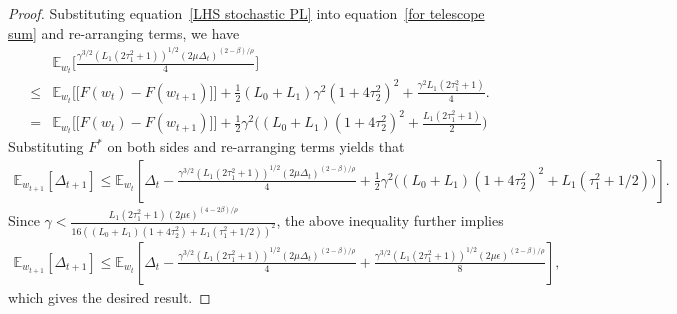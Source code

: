 \documentclass[10pt]{article} %
\def\eqref#1{equation~\ref{#1}}
\newtheorem{proof}{Proof}
\begin{document}
\begin{proof}
Substituting \eqref{LHS stochastic PL} into \eqref{for telescope sum} and re-arranging terms, we have 
\begin{align}
       &\mathbb{E}_{w_t}\Big[\frac{\gamma^{{3}/{2}} (L_1(2\tau_1^2+1))^{1/2}(2\mu \Delta_t)^{(2-\beta)/\rho}}{4}\Big]\nonumber\\ \leq& \mathbb{E}_{w_t}\Big[\big[F(w_t) - F(w_{t+1})\big]\Big] + \frac{1}{2}(L_0+L_1 )\gamma^2(1+4\tau_2^2)^2+\frac{\gamma^2L_1(2\tau_1^2+1)}{4}.\nonumber\\
       =& \mathbb{E}_{w_t}\Big[\big[F(w_t) - F(w_{t+1})\big]\Big] + \frac{1}{2}\gamma^2\big((L_0+L_1 )(1+4\tau_2^2)^2+\frac{L_1(2\tau_1^2+1)}{2}\big)
\end{align}
Substituting $F^*$ on both sides and re-arranging terms yields that
\begin{align}
    \mathbb{E}_{w_{t+1}}[\Delta_{t+1}]\leq \mathbb{E}_{w_t}[\Delta_t-\frac{\gamma^{3/2}(L_1(2\tau_1^2+1))^{1/2}(2\mu\Delta_t)^{(2-\beta)/\rho}}{4}+\frac{1}{2}\gamma^2\big((L_0+L_1 )(1+4\tau_2^2)^2+{L_1(\tau_1^2+1/2)})].\nonumber
\end{align}
Since $\gamma < \frac{L_1(2\tau_1^2+1)(2\mu\epsilon)^{(4-2\beta)/{\rho}}}{16((L_0+L_1)(1+4\tau_2^2)+L_1(\tau_1^2+1/2))^2}$, the above inequality further implies
\begin{align}
    \mathbb{E}_{w_{t+1}}[\Delta_{t+1}]\leq \mathbb{E}_{w_t}[\Delta_t - \frac{\gamma^{3/2}(L_1(2\tau_1^2+1))^{1/2}(2\mu\Delta_t)^{(2-\beta)/\rho}}{4}+ \frac{\gamma^{3/2}(L_1(2\tau_1^2+1))^{1/2}(2\mu\epsilon)^{(2-\beta)/\rho}}{8}],
    \label{descent PL2 stochastic}
\end{align}
which gives the desired result.
\end{proof}
\end{document}
